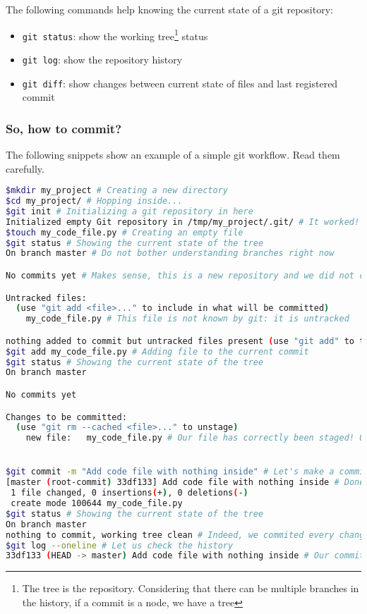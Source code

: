 \documentclass[12pt]{article}
\begin{document}
The following commands help knowing the current state of a git repository:
\begin{itemize}
\item \texttt{git status}: show the working tree\footnote{The tree is the repository. Considering that there can be multiple branches in the history, if a commit is a node, we have a tree} status
\item \texttt{git log}: show the repository history
\item \texttt{git diff}: show changes between current state of files and last registered commit
\end{itemize}


\subsubsection{So, how to commit?}

The following snippets show an example of a simple git workflow. Read them carefully.

\begin{lstlisting}[language=bash]
$mkdir my_project # Creating a new directory
$cd my_project/ # Hopping inside...
$git init # Initializing a git repository in here
Initialized empty Git repository in /tmp/my_project/.git/ # It worked!
$touch my_code_file.py # Creating an empty file
$git status # Showing the current state of the tree
On branch master # Do not bother understanding branches right now

No commits yet # Makes sense, this is a new repository and we did not commit anything yet

Untracked files:
  (use "git add <file>..." to include in what will be committed)
	my_code_file.py # This file is not known by git: it is untracked

nothing added to commit but untracked files present (use "git add" to track)
$git add my_code_file.py # Adding file to the current commit
$git status # Showing the current state of the tree
On branch master

No commits yet

Changes to be committed:
  (use "git rm --cached <file>..." to unstage)
	new file:   my_code_file.py # Our file has correctly been staged! Our commit is now ready :)


$git commit -m "Add code file with nothing inside" # Let's make a commit with our little file now
[master (root-commit) 33df133] Add code file with nothing inside # Done :)
 1 file changed, 0 insertions(+), 0 deletions(-)
 create mode 100644 my_code_file.py
$git status # Showing the current state of the tree
On branch master
nothing to commit, working tree clean # Indeed, we commited every change we made. Everything is up-to-date
$git log --oneline # Let us check the history
33df133 (HEAD -> master) Add code file with nothing inside # Our commit is just there :)
\end{lstlisting}
\end{document}
